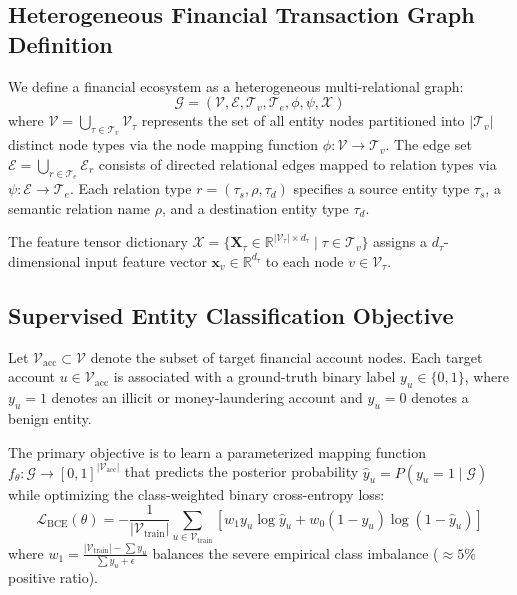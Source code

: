 \documentclass[conference]{IEEEtran}
\begin{document}
\subsection{Heterogeneous Financial Transaction Graph Definition}
We define a financial ecosystem as a heterogeneous multi-relational graph:
\begin{equation}
    \mathcal{G} = (\mathcal{V}, \mathcal{E}, \mathcal{T}_v, \mathcal{T}_e, \phi, \psi, \mathcal{X})
\end{equation}
where $\mathcal{V} = \bigcup_{\tau \in \mathcal{T}_v} \mathcal{V}_\tau$ represents the set of all entity nodes partitioned into $|\mathcal{T}_v|$ distinct node types via the node mapping function $\phi: \mathcal{V} \to \mathcal{T}_v$. The edge set $\mathcal{E} = \bigcup_{r \in \mathcal{T}_e} \mathcal{E}_r$ consists of directed relational edges mapped to relation types via $\psi: \mathcal{E} \to \mathcal{T}_e$. Each relation type $r = (\tau_s, \rho, \tau_d)$ specifies a source entity type $\tau_s$, a semantic relation name $\rho$, and a destination entity type $\tau_d$.

The feature tensor dictionary $\mathcal{X} = \{\mathbf{X}_\tau \in \mathbb{R}^{|\mathcal{V}_\tau| \times d_\tau} \mid \tau \in \mathcal{T}_v\}$ assigns a $d_\tau$-dimensional input feature vector $\mathbf{x}_v \in \mathbb{R}^{d_\tau}$ to each node $v \in \mathcal{V}_\tau$.

\subsection{Supervised Entity Classification Objective}
Let $\mathcal{V}_{\text{acc}} \subset \mathcal{V}$ denote the subset of target financial account nodes. Each target account $u \in \mathcal{V}_{\text{acc}}$ is associated with a ground-truth binary label $y_u \in \{0, 1\}$, where $y_u = 1$ denotes an illicit or money-laundering account and $y_u = 0$ denotes a benign entity. 

The primary objective is to learn a parameterized mapping function $f_\theta: \mathcal{G} \to [0, 1]^{|\mathcal{V}_{\text{acc}}|}$ that predicts the posterior probability $\hat{y}_u = P(y_u = 1 \mid \mathcal{G})$ while optimizing the class-weighted binary cross-entropy loss:
\begin{equation}
    \mathcal{L}_{\text{BCE}}(\theta) = -\frac{1}{|\mathcal{V}_{\text{train}}|} \sum_{u \in \mathcal{V}_{\text{train}}} \left[ w_1 y_u \log \hat{y}_u + w_0 (1 - y_u) \log (1 - \hat{y}_u) \right]
    \label{eq:bce_loss}
\end{equation}
where $w_1 = \frac{|\mathcal{V}_{\text{train}}| - \sum y_u}{\sum y_u + \epsilon}$ balances the severe empirical class imbalance ($\approx 5\%$ positive ratio).
\end{document}
